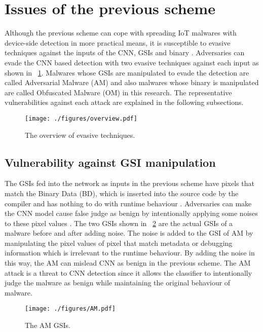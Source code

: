 \section{Issues of the previous scheme } 
Although the previous scheme can cope with spreading IoT malwares with device-side detection in more practical means, it is susceptible to evasive techniques against the inputs of the CNN, GSIs and binary \cite{attack1, attack2}.
Adversaries can evade the CNN based detection with two evasive techniques against each input as shown in \figurename~\ref{fig:ov}.
Malwares whose GSIs are manipulated to evade the detection are called Adversarial Malware (AM) and also malwares whose binary is manipulated are called Obfuscated Malware (OM) in this research.  
The representative vulnerabilities against each attack are explained in the following subsections.

\begin{figure}[h]
 \centering
 \texttt{[image: ./figures/overview.pdf]}
 \caption{The overview of evasive techniques.} 
 \label{fig:ov}
\end{figure}
\newpage

\subsection{Vulnerability against GSI manipulation}
The GSIs fed into the network as inputs in the previous scheme have pixels that match the Binary Data (BD), which is inserted into the source code by the compiler and has nothing to do with runtime behaviour \cite{am}.
Adversaries can make the CNN model cause false judge as benign by intentionally applying some noises to these pixel values \cite{am}.
The two GSIs shown in \figurename~\ref{fig:amGSI} are the actual GSIs of a malware before and after adding noise.
The noise is added to the GSI of AM by manipulating the pixel values of pixel that match metadata or debugging information which is irrelevant to the runtime behaviour.
By adding the noise in this way, the AM can mislead CNN as benign in the previous scheme.
The AM attack is a threat to CNN detection since it allows the classifier to intentionally judge the malware as benign while maintaining the original behaviour of malware.

\begin{figure}[h]
 \centering
 \texttt{[image: ./figures/AM.pdf]}
 \caption{The AM GSIs.} 
 \label{fig:amGSI}
\end{figure}
\newpage
